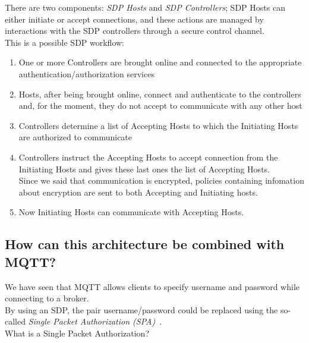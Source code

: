 \documentclass[12pt]{report}
\begin{document}
{{There are two components: \emph{SDP Hosts} and \emph{SDP Controllers}; SDP Hosts can either initiate or accept connections, and these actions are managed by interactions with the SDP controllers through a secure control channel.\\
This is a possible SDP workflow:

\begin{enumerate}
\item One or more Controllers are brought online and connected to the appropriate authentication/authorization services
\item Hosts, after being brought online, connect and authenticate to the controllers and, for the moment, they do not accept to communicate with any other host
\item Controllers determine a list of Accepting Hosts to which the Initiating Hosts are authorized to communicate
\item Controllers instruct the Accepting Hosts to accept connection from the Initiating Hosts and gives these last ones the list of Accepting Hosts.\\
Since we said that communication is encrypted, policies containing infomation about encryption are sent to both Accepting and Initiating hosts.
\item Now Initiating Hosts can communicate with Accepting Hosts.\\
\end{enumerate}

\subsection{How can this architecture be combined with MQTT?}
\bigskip

We have seen that MQTT allows clients to specify username and password while connecting to a broker.\\By using an SDP, the pair username/password could be replaced using the so-called \emph{Single Packet Authorization (SPA)}~\cite{mqttonlywithsdp}.\\

What is a Single Packet Authorization?~\cite{portknockandspaanalysis}\\

}}
\end{document}
